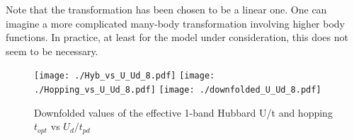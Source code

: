 \documentclass[prl,12pt,onecolumn,nofootinbib,notitlepage,english,superscriptaddress]{revtex4-1}
\begin{document}
Note that the transformation has been chosen to be a linear one. One can imagine a more complicated 
many-body transformation involving higher body functions. In practice, at least for the model under 
consideration, this does not seem to be necessary. 

\begin{figure}[]
\centering
\texttt{[image: ./Hyb\_vs\_U\_Ud\_8.pdf]}
\texttt{[image: ./Hopping\_vs\_U\_Ud\_8.pdf]}
\texttt{[image: ./downfolded\_U\_Ud\_8.pdf]}
\caption{Downfolded values of the effective 1-band Hubbard U/t and hopping $t_{opt}$ vs $U_d/t_{pd}$}
\label{fig:hamfit} 
\end{figure}	
\end{document}
